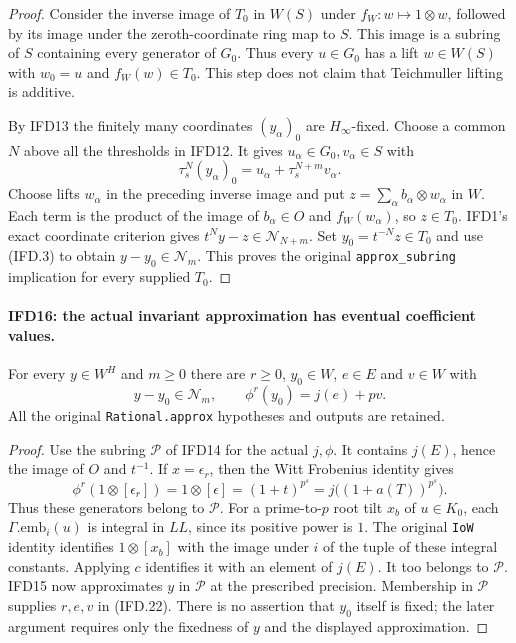 \documentclass[11pt,a4paper]{article}
\numberwithin{equation}{section}
\theoremstyle{remark}\newtheorem{remark}[theorem]{Remark}
\begin{document}
\begin{proof}
Consider the inverse image of $T_0$ in $W(S)$ under
$f_W:w\mapsto1\otimes w$, followed by its image under the
zeroth-coordinate ring map to $S$. This image is a subring of $S$
containing every generator of $G_0$. Thus every $u\in G_0$ has
a lift $w\in W(S)$ with $w_0=u$ and $f_W(w)\in T_0$.
This step does not claim that Teichmuller lifting is additive.

By IFD13 the finitely many coordinates $(y_\alpha)_0$ are
$H_\infty$-fixed. Choose a common $N$ above all the thresholds
in IFD12. It gives $u_\alpha\in G_0,v_\alpha\in S$ with
\[
       \tau_s^N(y_\alpha)_0
                      =u_\alpha+\tau_s^{N+m}v_\alpha.
\]
Choose lifts $w_\alpha$ in the preceding inverse image and put
$z=\sum_\alpha b_\alpha\otimes w_\alpha$ in $W$.
Each term is the product of the image of $b_\alpha\in O$ and
$f_W(w_\alpha)$, so $z\in T_0$. IFD1's exact coordinate
criterion gives $t^Ny-z\in\mathcal N_{N+m}$.
Set $y_0=t^{-N}z\in T_0$ and use (IFD.3) to obtain
$y-y_0\in\mathcal N_m$. This proves the original
\texttt{approx\_\allowbreak subring} implication for every supplied $T_0$.
\end{proof}

\paragraph{IFD16: the actual invariant approximation has eventual coefficient values.}
\label{claim:IFD16}
For every $y\in W^H$ and $m\geq0$ there are $r\geq0$,
$y_0\in W$, $e\in E$ and $v\in W$ with
\[
          y-y_0\in\mathcal N_m,\qquad \phi^r(y_0)=j(e)+pv.
                                                               \tag{IFD.22}
\]
All the original \texttt{Rational.\allowbreak approx} hypotheses and outputs
are retained.

\begin{proof}
Use the subring $\mathcal P$ of IFD14 for the actual $j,\phi$.
It contains $j(E)$, hence the image of $O$ and $t^{-1}$.
If $x=\epsilon_r$, then the Witt Frobenius identity gives
\[
 \phi^r(1\otimes[\epsilon_r])
       =1\otimes[\epsilon]
       =(1+t)^{p^s}=j\bigl((1+a(T))^{p^s}\bigr).
\]
Thus these generators belong to $\mathcal P$.
For a prime-to-$p$ root tilt $x_b$ of $u\in K_0$, each
$\Gamma.\mathrm{emb}_i(u)$ is integral in $LL$, since its positive
power is $1$. The original \texttt{Io\allowbreak W} identity identifies
$1\otimes[x_b]$ with the image under $i$ of the tuple of these
integral constants. Applying $c$ identifies it with an element of
$j(E)$. It too belongs to $\mathcal P$.
IFD15 now approximates $y$ in $\mathcal P$ at the prescribed
precision. Membership in $\mathcal P$ supplies $r,e,v$ in
(IFD.22). There is no assertion that $y_0$ itself is fixed; the
later argument requires only the fixedness of $y$ and the displayed
approximation.
\end{proof}
\end{document}
